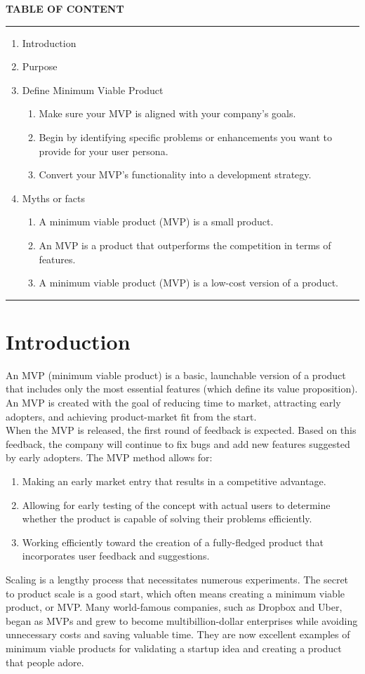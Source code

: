 \documentclass[paper=a4, fontsize=11pt]{scrartcl}
\numberwithin{equation}{section}		%
\numberwithin{figure}{section}			%
\numberwithin{table}{section}				%
\begin{document}
\newpage
\textbf{TABLE OF CONTENT}\\
\rule{\textwidth}{1pt}
\begin{enumerate}
    \item Introduction
    \item Purpose
    \item Define Minimum Viable Product
    \begin{enumerate}
        \item Make sure your MVP is aligned with your company's goals.
        \item Begin by identifying specific problems or enhancements you want to provide for your user persona.
        \item Convert your MVP's functionality into a development strategy.
    \end{enumerate}
    \item Myths or facts
    \begin{enumerate}
        \item A minimum viable product (MVP) is a small product.
        \item An MVP is a product that outperforms the competition in terms of features.
        \item A minimum viable product (MVP) is a low-cost version of a product.
    \end{enumerate}
\end{enumerate}
\rule{\textwidth}{1pt}
\newpage
\Large
\section{Introduction}
An MVP (minimum viable product) is a basic, launchable version of a product that includes only the most essential features (which define its value proposition). An MVP is created with the goal of reducing time to market, attracting early adopters, and achieving product-market fit from the start.\\
When the MVP is released, the first round of feedback is expected. Based on this feedback, the company will continue to fix bugs and add new features suggested by early adopters.
The MVP method allows for:
\begin{enumerate}
    \item Making an early market entry that results in a competitive advantage.
    \item Allowing for early testing of the concept with actual users to determine whether the product is capable of solving their problems efficiently.
    \item Working efficiently toward the creation of a fully-fledged product that incorporates user feedback and suggestions.
\end{enumerate}
Scaling is a lengthy process that necessitates numerous experiments. The secret to product scale is a good start, which often means creating a minimum viable product, or MVP. Many world-famous companies, such as Dropbox and Uber, began as MVPs and grew to become multibillion-dollar enterprises while avoiding unnecessary costs and saving valuable time. They are now excellent examples of minimum viable products for validating a startup idea and creating a product that people adore.
\end{document}
